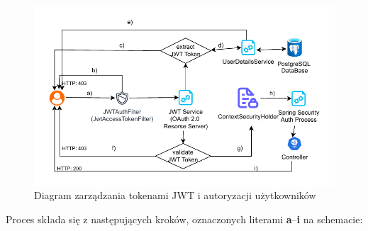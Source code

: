 \begin{figure}[ht]
    \centering
    \includegraphics[width=.9\linewidth]{rys03/Diagram_dotępu_do_zasobów_systemu}
    \caption{Diagram zarządzania tokenami JWT i autoryzacji użytkowników~\cite{JWToauth}}
    \label{fig:resource_access_flow}
\end{figure}

Proces składa się z następujących kroków, oznaczonych literami \textbf{a}–\textbf{i} na schemacie:

